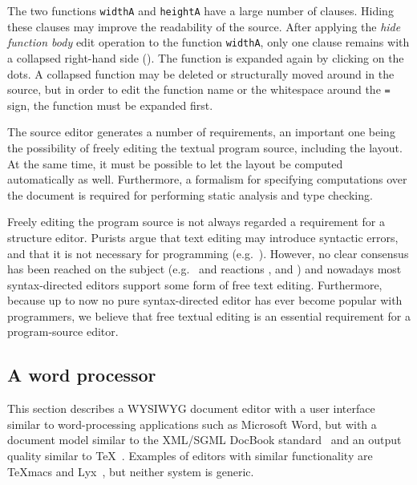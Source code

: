 The two functions \verb|widthA| and \verb|heightA| have a large number of clauses. Hiding these clauses may improve the readability of the source. After applying the {\em hide function body} edit operation to the function \verb|widthA|,  only one clause remains with a collapsed right-hand side ({\tt \framebox{\rule{0cm}{1.5ex}\dots}}). The function is expanded again by clicking on the dots. A collapsed function may be deleted or structurally moved around in the source, but in order to edit the function name or the whitespace around the \verb|=| sign, the function must be expanded first.


The source editor generates a number of requirements, an important one being the possibility of freely editing the textual program source, including the layout. At the same time, it must be possible to let the layout be computed automatically as well. Furthermore, a formalism for specifying computations over the document is required for performing static analysis and type checking.

Freely editing the program source is not always regarded a requirement for a structure editor. Purists argue that text editing may introduce syntactic errors, and that it is not necessary for programming (e.g.~\cite{teitelbaum81progSynth, magnusson90orm}). However, no clear consensus has been reached on the subject (e.g.~\cite{abandonText82waters} and reactions \cite{shani83notAbandon, responseToWaters83notkin}, and \cite{vanter94practical}) and nowadays most syntax-directed editors support some form of free text editing. Furthermore, because up to now no pure syntax-directed editor has ever become popular with programmers, we believe that free textual editing is an essential requirement for a program-source editor.


%																
\subsection{A word processor} \label{sect:wordprocessor} This section describes a WYSIWYG document editor with a user interface similar to word-processing applications such as Microsoft Word, but with a document model similar to the XML/SGML DocBook standard~\cite{walsh02docbook} and an output quality similar to \TeX~\cite{knuth84tex}. Examples of editors with similar functionality are TeXmacs\cite{texmacs} and Lyx~\cite{lyx}, but neither system is generic.


